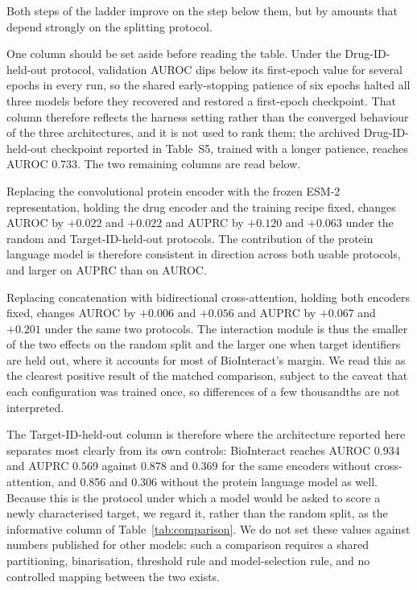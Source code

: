 \documentclass[fleqn,10pt]{wlscirep}
\begin{document}
\FloatBarrier

Both steps of the ladder improve on the step below them, but by amounts that
depend strongly on the splitting protocol.

One column should be set aside before reading the table.  Under the
Drug-ID-held-out protocol, validation AUROC dips below its first-epoch value for
several epochs in every run, so the shared early-stopping patience of six epochs
halted all three models before they recovered and restored a first-epoch
checkpoint.  That column therefore reflects the harness setting rather than the
converged behaviour of the three architectures, and it is not used to rank them;
the archived Drug-ID-held-out checkpoint reported in Table~S5, trained with a
longer patience, reaches AUROC 0.733.  The two remaining columns are read below.

Replacing the convolutional protein encoder with the frozen ESM-2 representation,
holding the drug encoder and the training recipe fixed, changes AUROC by
$+0.022$ and $+0.022$ and AUPRC by $+0.120$ and $+0.063$ under the random and
Target-ID-held-out protocols.  The contribution of the protein language model is
therefore consistent in direction across both usable protocols, and larger on
AUPRC than on AUROC.

Replacing concatenation with bidirectional cross-attention, holding both
encoders fixed, changes AUROC by $+0.006$ and $+0.056$ and AUPRC by $+0.067$ and
$+0.201$ under the same two protocols.  The interaction module is thus the
smaller of the two effects on the random split and the larger one when target
identifiers are held out, where it accounts for most of BioInteract's margin.
We read this as the clearest positive result of the matched comparison, subject
to the caveat that each configuration was trained once, so differences of a few
thousandths are not interpreted.

The Target-ID-held-out column is therefore where the architecture reported here
separates most clearly from its own controls: BioInteract reaches AUROC 0.934
and AUPRC 0.569 against 0.878 and 0.369 for the same encoders without
cross-attention, and 0.856 and 0.306 without the protein language model as well.
Because this is the protocol under which a model would be asked to score a newly
characterised target, we regard it, rather than the random split, as the
informative column of Table~\ref{tab:comparison}.  We do not set these values
against numbers published for other models: such a comparison requires a shared
partitioning, binarisation, threshold rule and model-selection rule, and no
controlled mapping between the two exists.
\end{document}
